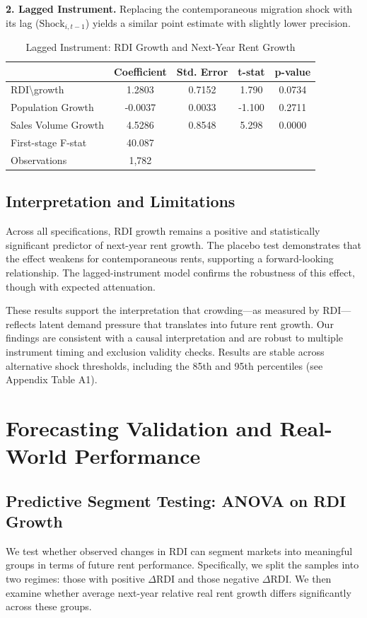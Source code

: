 \documentclass[APA,Times1COL]{WileyNJDv5} %
\begin{document}
\textbf{2. Lagged Instrument.} Replacing the contemporaneous migration shock with its lag ($\text{Shock}_{i,t-1}$) yields a similar point estimate with slightly lower precision.

\begin{table}[h]
	\centering
	\caption{Lagged Instrument: RDI Growth and Next-Year Rent Growth}
	\label{tab:lagged}
	\begin{tabular}{lcccc} \toprule
		& Coefficient & Std. Error & t-stat & p-value \\ \midrule
		RDI\textbackslash growth & 1.2803 & 0.7152 & 1.790 & 0.0734 \\
		Population Growth & -0.0037 & 0.0033 & -1.100 & 0.2711 \\
		Sales Volume Growth & 4.5286 & 0.8548 & 5.298 & 0.0000 \\
		\midrule
		First-stage F-stat & 40.087 & & & \\
		Observations & 1,782 & & & \\ \bottomrule
	\end{tabular}
\end{table}

\subsection{Interpretation and Limitations}
Across all specifications, RDI growth remains a positive and statistically significant predictor of next-year rent growth. The placebo test demonstrates that the effect weakens for contemporaneous rents, supporting a forward-looking relationship. The lagged-instrument model confirms the robustness of this effect, though with expected attenuation.

These results support the interpretation that crowding---as measured by RDI---reflects latent demand pressure that translates into future rent growth. Our findings are consistent with a causal interpretation and are robust to multiple instrument timing and exclusion validity checks. Results are stable across alternative shock thresholds, including the 85th and 95th percentiles (see Appendix Table A1).

\section{Forecasting Validation and Real-World Performance}

\subsection{Predictive Segment Testing: ANOVA on RDI Growth}
We test whether observed changes in RDI can segment markets into meaningful groups in terms of future rent performance. Specifically, we split the samples into two regimes: those with positive $\Delta$RDI and those negative $\Delta$RDI. We then examine whether average next-year relative real rent growth differs significantly across these groups.
\end{document}
